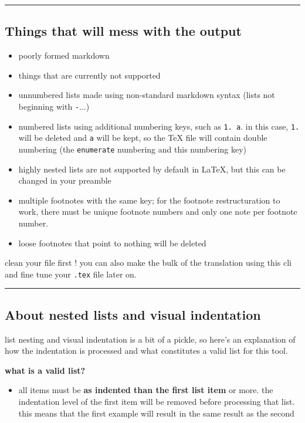 \documentclass[a4paper, 12pt, twoside]{article}
\begin{document}
\par\noindent\rule{\linewidth}{0.4pt}
\subsection{Things that will mess with the output}

\begin{itemize}
\item poorly formed markdown
\item things that are currently not supported
\item unnumbered lists made using non-standard markdown syntax (lists not beginning with \texttt{-}...)
\item numbered lists using additional numbering keys, such as \texttt{1. a}. in this case, \texttt{1.} will be deleted and \texttt{a} will be kept, so the TeX file will contain double numbering (the \texttt{enumerate} numbering and this numbering key)
\item highly nested lists are not supported by default in LaTeX, but this can be changed in your preamble
\item multiple footnotes with the same key; for the footnote restructuration to work, there must be unique footnote numbers and only one note per footnote number.
\item loose footnotes that point to nothing will be deleted 
\end{itemize}

clean your file first ! you can also make the bulk of the translation using this cli and fine tune your \texttt{.tex} 
file later on.

\par\noindent\rule{\linewidth}{0.4pt}
\subsection{About nested lists and visual indentation}

list nesting and visual indentation is a bit of a pickle, so here's an explanation of how
the indentation is processed and what constitutes a valid list for this tool.

\textbf{what is a valid list?}

\begin{itemize}
\item all items must be \textbf{as indented than the first list item} or more. the indentation level of the first item will be removed before processing that list. this means that the first example will result in the same result as the second 
\end{itemize}
\end{document}
